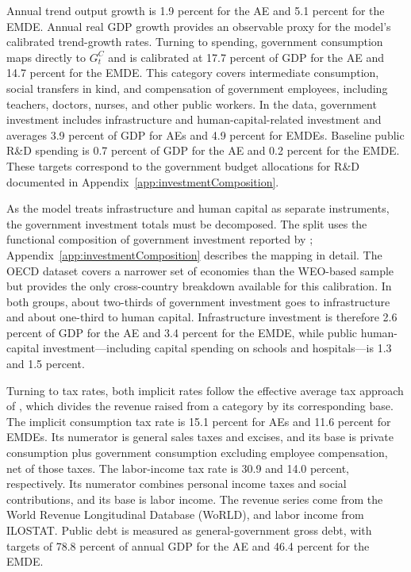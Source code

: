 \documentclass[a4paper,11pt]{article}
\begin{document}
Annual trend output growth is 1.9 percent for the AE and 5.1 percent for the EMDE.
Annual real GDP growth provides an observable proxy for the model's calibrated trend-growth rates.
Turning to spending, government consumption maps directly to $G_t^C$ and is calibrated at 17.7 percent of GDP for the AE and 14.7 percent for the EMDE.
This category covers intermediate consumption, social transfers in kind, and compensation of government employees, including teachers, doctors, nurses, and other public workers.
In the data, government investment includes infrastructure and human-capital-related investment and averages 3.9 percent of GDP for AEs and 4.9 percent for EMDEs.
Baseline public R\&D spending is 0.7 percent of GDP for the AE and 0.2 percent for the EMDE.
These targets correspond to the government budget allocations for R\&D documented in Appendix~\ref{app:investmentComposition}.

As the model treats infrastructure and human capital as separate instruments, the government investment totals must be decomposed.
The split uses the functional composition of government investment reported by \citet{OECD2025Glance}; Appendix~\ref{app:investmentComposition} describes the mapping in detail.
The OECD dataset covers a narrower set of economies than the WEO-based sample but provides the only cross-country breakdown available for this calibration.
In both groups, about two-thirds of government investment goes to infrastructure and about one-third to human capital.
Infrastructure investment is therefore 2.6 percent of GDP for the AE and 3.4 percent for the EMDE, while public human-capital investment---including capital spending on schools and hospitals---is 1.3 and 1.5 percent.

Turning to tax rates, both implicit rates follow the effective average tax approach of \citet{MendozaRazinTesar1994}, which divides the revenue raised from a category by its corresponding base.
The implicit consumption tax rate is 15.1 percent for AEs and 11.6 percent for EMDEs.
Its numerator is general sales taxes and excises, and its base is private consumption plus government consumption excluding employee compensation, net of those taxes.
The labor-income tax rate is 30.9 and 14.0 percent, respectively.
Its numerator combines personal income taxes and social contributions, and its base is labor income.
The revenue series come from the World Revenue Longitudinal Database (WoRLD), and labor income from ILOSTAT.
Public debt is measured as general-government gross debt, with targets of 78.8 percent of annual GDP for the AE and 46.4 percent for the EMDE.
\end{document}
